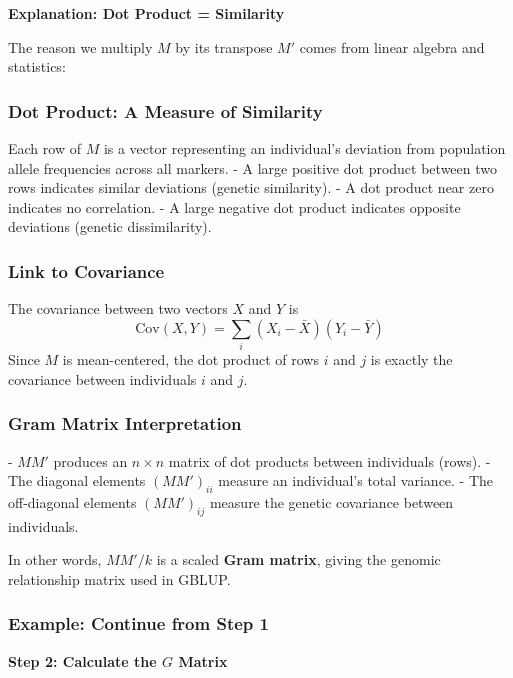 \documentclass[12pt]{article}
\begin{document}
\begin{enumerate}
    \textbf{Explanation: Dot Product = Similarity}

    The reason we multiply $M$ by its transpose $M'$ comes from linear algebra and statistics:

    \subsubsection*{Dot Product: A Measure of Similarity}
    Each row of $M$ is a vector representing an individual's deviation from population allele frequencies across all markers.
    - A large positive dot product between two rows indicates similar deviations (genetic similarity).
    - A dot product near zero indicates no correlation.
    - A large negative dot product indicates opposite deviations (genetic dissimilarity).

    \subsubsection*{Link to Covariance}
    The covariance between two vectors $X$ and $Y$ is
    \[
    \text{Cov}(X,Y) = \sum_i (X_i - \bar{X})(Y_i - \bar{Y})
    \]
    Since $M$ is mean-centered, the dot product of rows $i$ and $j$ is exactly the covariance between individuals $i$ and $j$.

    \subsubsection*{Gram Matrix Interpretation}
    - $MM'$ produces an $n \times n$ matrix of dot products between individuals (rows).
    - The diagonal elements $(MM')_{ii}$ measure an individual's total variance.
    - The off-diagonal elements $(MM')_{ij}$ measure the genetic covariance between individuals.

    In other words, $MM'/k$ is a scaled \textbf{Gram matrix}, giving the genomic relationship matrix used in GBLUP.
\end{enumerate}
\subsubsection*{Example: Continue from Step 1}

\textbf{Step 2: Calculate the $G$ Matrix}
\end{document}
